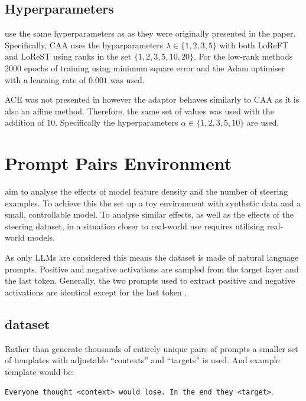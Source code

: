 \subsection{Hyperparameters}

 use the same hyperparameters as \citet{steering-clear} as they were originally presented in the paper.
Specifically, CAA uses the hyparparameters $\lambda \in \{1, 2, 3, 5\}$ with both LoReFT and LoReST using ranks in the set $\{1, 2, 3, 5, 10, 20\}$.
For the low-rank methods 2000 epochs of training using minimum square error and the Adam \cite{adam} optimiser with a learning rate of $0.001$ was used.

ACE was not presented in \citet{steering-clear} however the adaptor behaves similarly to CAA as it is also an affine method.
Therefore, the same set of values was used with the addition of $10$.
Specifically the hyperparameters $\alpha \in \{1, 2, 3, 5, 10\}$ are used.

\section{Prompt Pairs Environment}
\label{sec:prompt-pairs}

\citet{steering-clear} aim to analyse the effects of model feature density and the number of steering examples.
To achieve this the set up a toy environment with synthetic data and a small, controllable model.
To analyse similar effects, as well as the effects of the steering dataset, in a situation closer to real-world use requires utilising real-world models.

As only LLMs are considered this means the dataset is made of natural language prompts.
Positive and negative activations are sampled from the target layer and the last token.
Generally, the two prompts used to extract positive and negative activations are identical except for the last token \citep{steerability, icv, activation-addition}.

\subsection{dataset}

Rather than generate thousands of entirely unique pairs of prompts a smaller set of templates with adjustable ``contexts'' and ``targets'' is used.
And example template would be:

\texttt{Everyone thought <context> would lose. In the end they <target>}.

